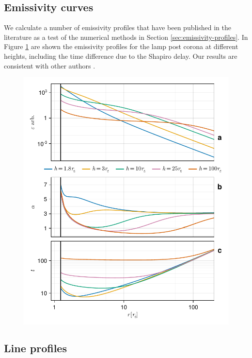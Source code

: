 \documentclass[fleqn,usenatbib]{mnras}
\begin{document}
\subsection{Emissivity curves}

We calculate a number of emissivity profiles that have been published in the literature as a test of the numerical methods in Section \ref{sec:emissivity-profiles}. In Figure \ref{fig:emissivity-profiles} are shown the emissivity profiles for the lamp post corona at different heights, including the time difference due to the Shapiro delay. Our results are consistent with other authors \citep{wilkins_understanding_2012,dauser_irradiation_2013}.

\begin{figure}
	\centering
	\includegraphics[width=0.99\linewidth]{figures/emissivity.point-source.pdf}
	\caption{}
	\label{fig:emissivity-profiles}
\end{figure}


\subsection{Line profiles}
\end{document}
